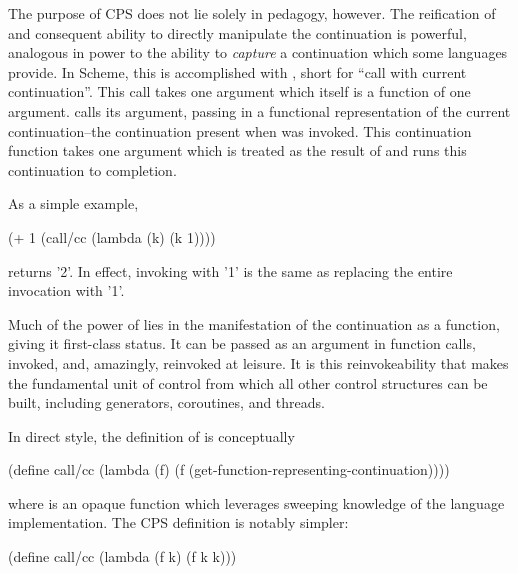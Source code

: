 \documentclass[ms,electronic,twosidetoc,letterpaper,chaptercenter,parttop]{byumsphd}
\begin{document}
The purpose of CPS does not lie solely in pedagogy, however. The reification of and
consequent ability to directly manipulate the continuation is powerful,
analogous in power to the ability to \emph{capture} a continuation which some languages
provide. In Scheme, this is accomplished with , short for ``call with
current continuation''. This call takes one argument which itself is a function of one
argument.  calls its argument, passing in a functional representation of the
current continuation--the continuation present when  was invoked. This
continuation function takes one argument which is treated as the result of 
and runs this continuation to completion.

As a simple example,
\begin{schemedisplay}
(+ 1 (call/cc
       (lambda (k)
         (k 1))))
\end{schemedisplay}
returns \scheme'2'. In effect, invoking  with \scheme'1' is the same 
as replacing the entire  invocation with \scheme'1'.

Much of the power of  lies in the manifestation of the continuation as a
function, giving it first-class status. It can be passed as an argument in function calls,
invoked, and, amazingly, reinvoked at leisure. It is this reinvokeability that makes
 the fundamental unit of control from which all other control structures can
be built, including generators, coroutines, and threads.


In direct style, the definition of  is conceptually 
\begin{schemedisplay}
(define call/cc
  (lambda (f)
    (f (get-function-representing-continuation))))
\end{schemedisplay}
where  is an opaque function which leverages
sweeping knowledge of the language implementation. The CPS definition is notably simpler:
\begin{schemedisplay}
(define call/cc
  (lambda (f k)
    (f k k)))
\end{schemedisplay}
\end{document}
